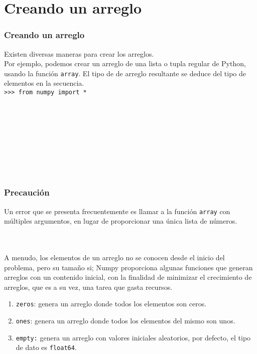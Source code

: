 \documentclass[12pt]{beamer}
\begin{document}
\section{Creando un arreglo}
\begin{frame}[fragile]
\frametitle{Creando un arreglo}
Existen diversas maneras para crear los arreglos.
\\
\bigskip
Por ejemplo, podemos crear un arreglo de una lista o tupla regular de Python, usando la funci\'{o}n \texttt{array}. El tipo de de arreglo resultante se deduce del tipo de elementos en la secuencia.
\\
\medskip
\texttt{>>> from numpy import *} \\
 \\
\\
\\
 \\
 \\
 \\
 \\
 \\
\end{frame}
\begin{frame}
\frametitle{Precauci\'{o}n}
Un error que se presenta frecuentemente es llamar a la funci\'{o}n \texttt{array} con m\'{u}ltiples argumentos, en lugar de proporcionar una  \'{u}nica lista de n\'{u}meros.
\\
\bigskip
{} \\
 \\
\end{frame}
\begin{frame}
A menudo, los elementos de un arreglo no se conocen desde el inicio del problema, pero su tamaño si; Numpy proporciona algunas funciones que generan arreglos con un contenido inicial, con la finalidad de minimizar el crecimiento de arreglos, que es a su vez, una tarea que gasta recursos.
\\
\bigskip
\begin{enumerate}[<+->]
\item \texttt{zeros}: genera un arreglo donde todos los elementos son ceros.
\item \texttt{ones}: genera un arreglo donde todos los elementos del mismo son unos.
\item \texttt{empty:} genera un arreglo con valores iniciales aleatorios, por defecto, el tipo de dato es \texttt{float64}.
\end{enumerate}
\end{frame}
\end{document}
